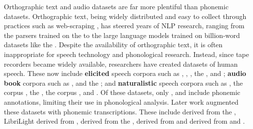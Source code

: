 Orthographic text and audio datasets are far more plentiful than phonemic datasets. Orthographic text, being widely distributed and easy to collect through practices such as web-scraping \citep{bansal-2022-datascaling}, has steered years of NLP research, ranging from the parsers trained on the  \citep{taylor2003penn} to the large language models trained on billion-word datasets like the  \citep{pile}. Despite the availability of orthographic text, it is often inappropriate for speech technology and phonological research. Instead, since tape recorders became widely available, researchers have created datasets of human speech. These now include \textbf{elicited} speech corpora such as , \citep{garofolo1993darpa},  \citep{conneau2023fleurs}, the  \citep{mazumder2021multilingual},  \citep{schultz2002globalphone} and  \citep{ardila-etal-2020-common}; \textbf{audio book} corpora such as  \citep{panayotov2015librispeech},  \citep{pratap2020mls} and the  \citep{8683536}; and \textbf{naturalistic} speech corpora such as  \citep{godfrey1992switchboard}, the  corpus \citep{cieri2004fisher}, the  \citep{bnc2007}, the  corpus \citep{pitt2007buckeye},  \citep{harper2011babel} and  \citep{9383459}. Of these datasets, only ,  and  include phonemic annotations, limiting their use in phonological analysis. Later work augmented these datasets with phonemic transcriptions. These include  derived from the  \citep{coleman2011mining}, LibriLight derived from  \citep{Kahn_2020},  derived from the  \citep{salesky-etal-2020-corpus},  derived from  \citep{ahn-chodroff-2022-voxcommunis} and  derived from  and  \citep{zhu-etal-2024-taste}.

